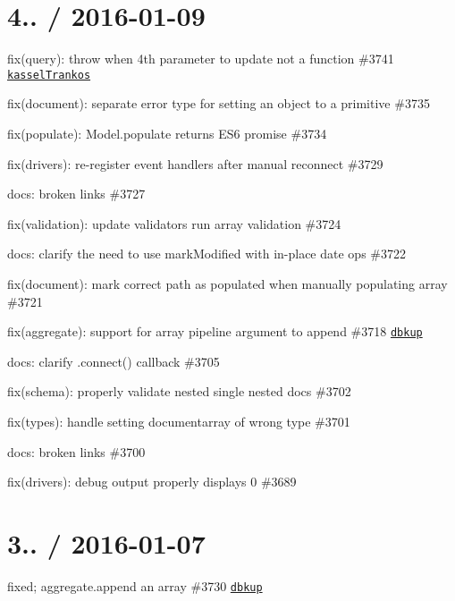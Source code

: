 \section*{4.. / 2016-\/01-\/09 }


\begin{DoxyItemize}
\item fix(query)\+: throw when 4th parameter to update not a function \#3741 \href{https://github.com/kasselTrankos}{\tt kassel\+Trankos}
\item fix(document)\+: separate error type for setting an object to a primitive \#3735
\item fix(populate)\+: Model.\+populate returns E\+S6 promise \#3734
\item fix(drivers)\+: re-\/register event handlers after manual reconnect \#3729
\item docs\+: broken links \#3727
\item fix(validation)\+: update validators run array validation \#3724
\item docs\+: clarify the need to use mark\+Modified with in-\/place date ops \#3722
\item fix(document)\+: mark correct path as populated when manually populating array \#3721
\item fix(aggregate)\+: support for array pipeline argument to append \#3718 \href{https://github.com/dbkup}{\tt dbkup}
\item docs\+: clarify {\ttfamily .connect()} callback \#3705
\item fix(schema)\+: properly validate nested single nested docs \#3702
\item fix(types)\+: handle setting documentarray of wrong type \#3701
\item docs\+: broken links \#3700
\item fix(drivers)\+: debug output properly displays \textquotesingle{}0\textquotesingle{} \#3689
\end{DoxyItemize}

\section*{3.. / 2016-\/01-\/07 }


\begin{DoxyItemize}
\item fixed; aggregate.\+append an array \#3730 \href{https://github.com/dbkup}{\tt dbkup}
\end{DoxyItemize}

